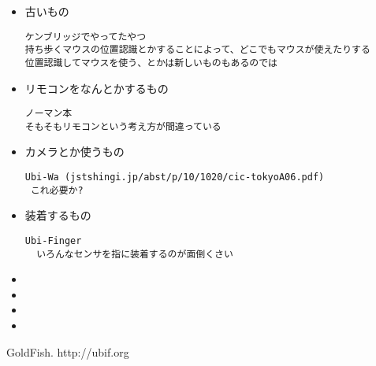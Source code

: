 \begin{itemize}
\item 古いもの

\begin{verbatim}
ケンブリッジでやってたやつ
持ち歩くマウスの位置認識とかすることによって、どこでもマウスが使えたりする
位置認識してマウスを使う、とかは新しいものもあるのでは
\end{verbatim}

\item リモコンをなんとかするもの

\begin{verbatim}
ノーマン本
そもそもリモコンという考え方が間違っている
\end{verbatim}

\item カメラとか使うもの

\begin{verbatim}
Ubi-Wa (jstshingi.jp/abst/p/10/1020/cic-tokyoA06.pdf)
 これ必要か?
\end{verbatim}

\item 装着するもの
\begin{verbatim}
Ubi-Finger
  いろんなセンサを指に装着するのが面倒くさい
\end{verbatim}

\item 
\item 
\item 
\item 
\end{itemize}

\begin{thebibliography}{10}

GoldFish. http://ubif.org

\end{thebibliography}

